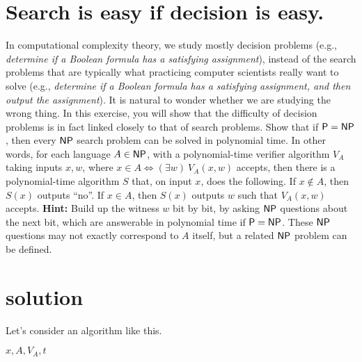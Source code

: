 

\maketitle
\thispagestyle{firststyle}
\vspace{-2.0cm}

\section{Search is easy if decision is easy.}
    In computational complexity theory, we study mostly decision problems
    (e.g., \emph{determine if a Boolean formula has a satisfying assignment}),
    instead of the search problems that are typically what practicing computer scientists really want to solve
    (e.g., \emph{determine if a Boolean formula has a satisfying assignment, and then output the assignment}).
    It is natural to wonder whether we are studying the wrong thing.
    In this exercise, you will show that the difficulty of decision problems is in fact linked closely to that of search problems.
        Show that if $\mathsf{P} = \mathsf{NP}$, then every $\mathsf{NP}$ search problem can be solved in polynomial time.
    In other words, for each language $A \in \mathsf{NP}$, with a polynomial-time verifier algorithm $V_A$ taking inputs $x,w$, where $x \in A \iff (\exists w)\ V_A(x,w)$ accepts, then there is a polynomial-time algorithm $S$ that, on input $x$, does the following.
    If $x \not\in A$, then $S(x)$ outputs ``no''.
    If $x \in A$, then $S(x)$ outputs $w$ such that $V_A(x,w)$ accepts.
        {\bf Hint:}
    Build up the witness $w$ bit by bit, by asking $\mathsf{NP}$ questions about the next bit, which are answerable in polynomial time if $\mathsf{P} = \mathsf{NP}$.
    These $\mathsf{NP}$ questions may not exactly correspond to $A$ itself, but a related $\mathsf{NP}$ problem can be defined.


\section*{solution}
Let's consider an algorithm like this.
\begin{algorithm}
\caption{$S(x)$} 
\begin{algorithmic}[]
\Require $x, A, V_A, t$
 
\EndIf
{}
\EndWhile
{}
\end{algorithmic}
\end{algorithm}

